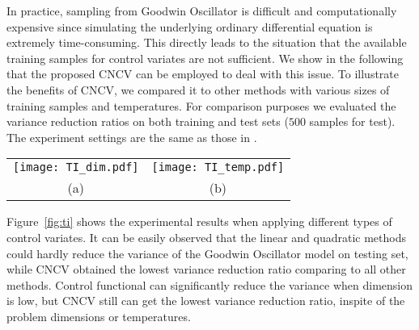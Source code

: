 \documentclass[runningheads]{llncs}
\begin{document}
In practice, sampling from Goodwin Oscillator is difficult and computationally expensive since simulating the underlying ordinary differential equation is extremely time-consuming. This directly leads to the situation that the available training samples for control variates are not sufficient. We show in the following that the proposed CNCV can be employed to deal with this issue.  
To illustrate the benefits of CNCV,  we compared it to other methods with various sizes of training samples and temperatures. For comparison purposes we evaluated the variance reduction ratios on both training and test sets ($500$ samples for test). The experiment settings are the same as those in \cite{oates2016controlled}.



\begin{figure*}[t!]
\centering
\vskip -0.1in
\begin{tabular}{cc}
\texttt{[image: TI\_dim.pdf]} &
\texttt{[image: TI\_temp.pdf]} \\
(a)&(b)
\end{tabular}
\vspace{-0.3cm}
\caption{Variance reduction ratio on test set of four different types of control variates (linear, quadratic, CF and CNCV). 3000 samples were used for training and the other 3000 samples were used for testing. (a) The average variance reduction ratio on test data versus the problem dimension; (b) The average variance reduction ratio on the test data for different temperatures.}
\label{fig:ti}
\end{figure*}

Figure~\ref{fig:ti} shows the experimental results when applying different types of control variates. It can be easily observed that the linear and quadratic methods could hardly reduce the variance of the Goodwin Oscillator model on testing set, while CNCV obtained the lowest variance reduction ratio comparing to all other methods. Control functional can significantly reduce the variance when dimension is low, but CNCV still can get the lowest variance reduction ratio, inspite of the problem dimensions or temperatures.
\end{document}
